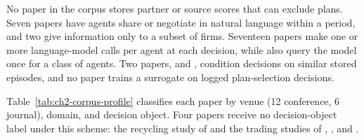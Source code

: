 \documentclass{icsthesis}
\begin{document}
\begin{mainmatter}
			No paper in the corpus stores partner or source scores that can exclude plans. Seven papers have agents share or negotiate in natural language within a period, and two give information only to a subset of firms. Seventeen papers make one or more language-model calls per agent at each decision, while \citet{Chopra2025} also query the model once for a class of agents. Two papers, \citet{Yoshizato2026} and \citet{Phan2026}, condition decisions on similar stored episodes, and no paper trains a surrogate on logged plan-selection decisions.

			Table~\ref{tab:ch2-corpus-profile} classifies each paper by venue (12 conference, 6 journal), domain, and decision object. Four papers receive no decision-object label under this scheme: the recycling study of \citet{Kuo2026} and the trading studies of \citet{VidlerWalsh2024}, \citet{Sashihara2025}, and \citet{ParhyGoldwasser2025}.


\end{mainmatter}
\end{document}
